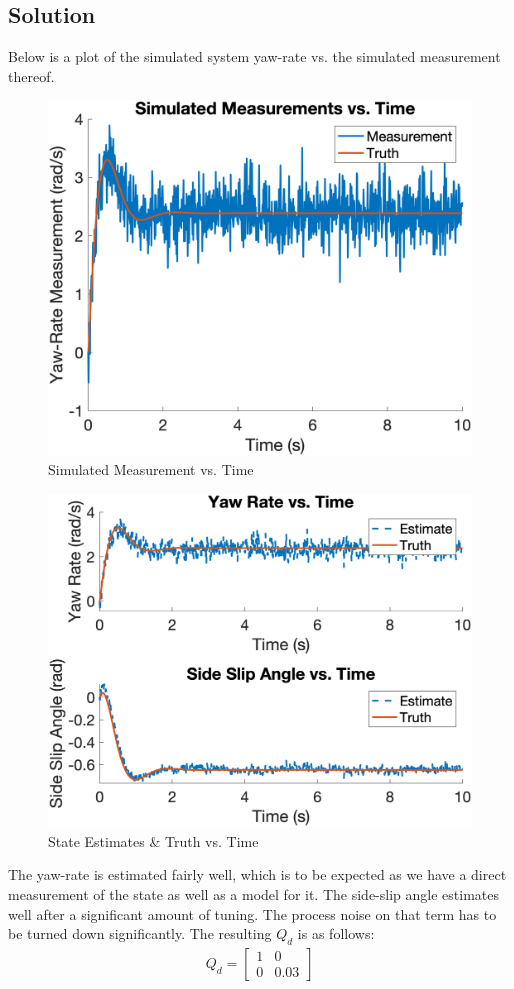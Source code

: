 \documentclass{article}
\begin{document}
\subsection*{Solution}
Below is a plot of the simulated system yaw-rate vs. the simulated measurement thereof.
\begin{figure}[H]
    \centering
    \includegraphics[width=0.75\linewidth]{../figures/p4a_meas.png}
    \caption{Simulated Measurement vs. Time}\label{fig:p4a_meas}
\end{figure}
\begin{figure}[H]
    \centering
    \includegraphics[width=0.75\linewidth]{../figures/p4a_kf.png}
    \caption{State Estimates \& Truth vs. Time}\label{fig:p4a_kf}
\end{figure}
The yaw-rate is estimated fairly well, which is to be expected as we have a direct measurement of the state as well as a model for it.  The side-slip angle estimates well after a significant amount of tuning.  The process noise on that term has to be turned down significantly.  The resulting $Q_d$ is as follows:
\begin{gather*}
    Q_d = \begin{bmatrix}
        1 & 0\\
        0 & 0.03
    \end{bmatrix}
\end{gather*}
\end{document}
